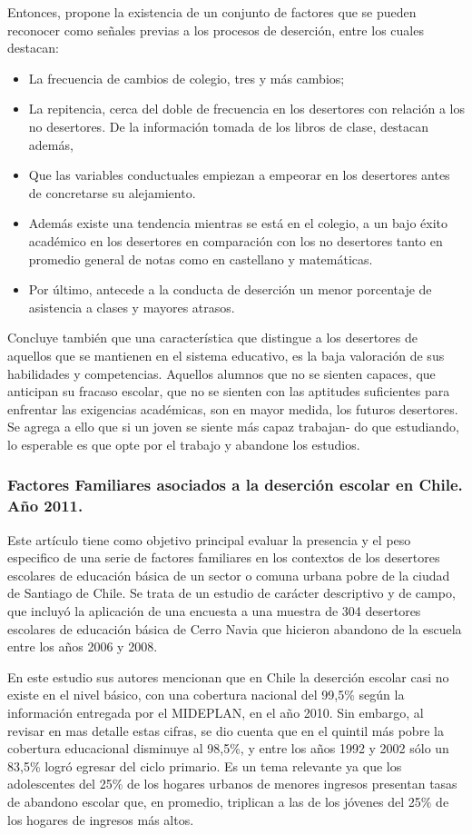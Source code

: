 Entonces, propone la existencia de un conjunto de factores que se pueden reconocer como señales previas a los procesos de deserción, entre los cuales destacan: 
\begin{itemize}
\item La frecuencia de cambios de colegio, tres y más cambios; 
\item La repitencia, cerca del doble de frecuencia en los desertores con relación a los no desertores. De la información tomada de los libros de clase, destacan además, 
\item Que las variables conductuales empiezan a empeorar en los desertores antes de concretarse su alejamiento. 
\item Además existe una tendencia mientras se está en el colegio, a un bajo éxito académico en los desertores en comparación con los no desertores tanto en promedio general de notas como en castellano y matemáticas. 
\item Por último, antecede a la conducta de deserción un menor porcentaje de asistencia a clases y mayores atrasos. 
\end{itemize}

Concluye también que una característica que distingue a los desertores de aquellos que se mantienen en el sistema educativo, es la baja valoración de sus habilidades y competencias. Aquellos alumnos que no se sienten capaces, que anticipan su fracaso escolar, que no se sienten con las aptitudes suficientes para enfrentar las exigencias académicas, son en mayor medida, los futuros desertores. Se agrega a ello que si un joven se siente más capaz trabajan- do que estudiando, lo esperable es que opte por el trabajo y abandone los estudios.

\subsubsection{Factores Familiares asociados a la deserción escolar en Chile. Año 2011.}
Este artículo tiene como objetivo principal evaluar la presencia y el peso especifico de una serie de factores familiares en los contextos de los desertores escolares de educación básica de un sector o comuna urbana pobre de la ciudad de Santiago de Chile. Se trata de un estudio de carácter descriptivo y de campo, que incluyó la aplicación de una encuesta a una muestra de 304 desertores escolares de educación básica de Cerro Navia que hicieron abandono de la escuela entre los años 2006 y 2008. 

En este estudio sus autores mencionan que en Chile la deserción escolar casi no existe en el nivel básico, con una cobertura nacional del 99,5\% según la información entregada por el MIDEPLAN, en el año 2010.  Sin embargo, al revisar en mas detalle estas cifras, se dio cuenta que en el quintil más pobre la cobertura educacional disminuye al 98,5\%, y entre los años 1992 y 2002 sólo un 83,5\% logró egresar del ciclo primario. Es un tema relevante ya que los adolescentes del 25\% de los hogares urbanos de menores ingresos presentan tasas de abandono escolar que, en promedio, triplican a las de los jóvenes del 25\% de los hogares de ingresos más altos.

